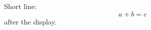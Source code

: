 \documentclass[10pt]{article}
\begin{document}
Short line:
$$ a + b = c $$
after the display.
\end{document}
